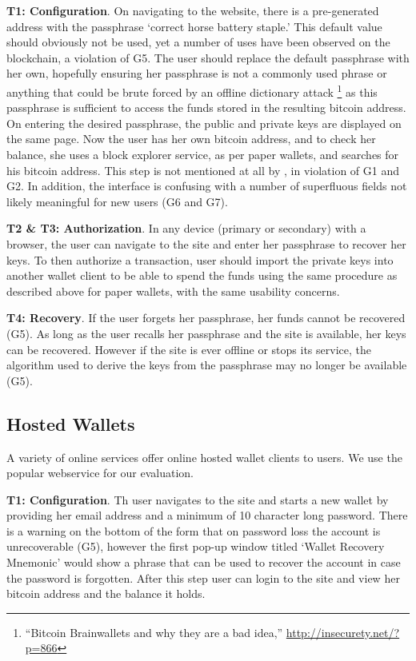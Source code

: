 \textbf{T1: Configuration}.
On navigating to the \brain website, there is a pre-generated address with the passphrase `correct horse battery staple.' This default value should obviously not be used, yet a number of uses have been observed on the blockchain, a violation of G5. The user should replace the default passphrase with her own, hopefully ensuring her passphrase is not a commonly used phrase or anything that could be brute forced by an offline dictionary attack \footnote{``Bitcoin Brainwallets and why they are a bad idea,'' \url{http://insecurety.net/?p=866}} as this passphrase is sufficient to access the funds stored in the resulting bitcoin address. On entering the desired passphrase, the public and private keys are displayed on the same page. Now the user has her own bitcoin address, and to check her balance, she uses  a block explorer service, as per paper wallets, and searches for his bitcoin address. This step is not mentioned at all by \brain, in violation of G1 and G2. In addition, the interface is confusing with a number of superfluous fields not likely meaningful for new users (G6 and G7).

\textbf{T2 \& T3: Authorization}.
In any device (primary or secondary) with a browser, the user can navigate to the \brain site and enter her passphrase to recover her keys. To then authorize a transaction, user should import the private keys into another wallet client to be able to spend the funds using the same procedure as described above for paper wallets, with the same usability concerns.

\textbf{T4: Recovery}.
If the user forgets her passphrase, her funds cannot be recovered (G5). As long as the user recalls her passphrase and the \brain site is available, her keys can be recovered. However if the site is ever offline or stops its service, the algorithm used to derive the keys from the passphrase may no longer be available (G5).

\subsection{Hosted Wallets}
\label{hosted}
A variety of online services offer online hosted wallet clients to users. We use the popular \block webservice for our evaluation.

\textbf{T1: Configuration}.
Th user navigates to the \block site and starts a new wallet by providing her email address and a minimum of 10 character long password. There is a warning on the bottom of the form that on password loss the account is unrecoverable (G5), however the first pop-up window titled `Wallet Recovery Mnemonic' would show a phrase that can be used to recover the account in case the password is forgotten. After this step user can login to the site and view her bitcoin address and the balance it holds.

